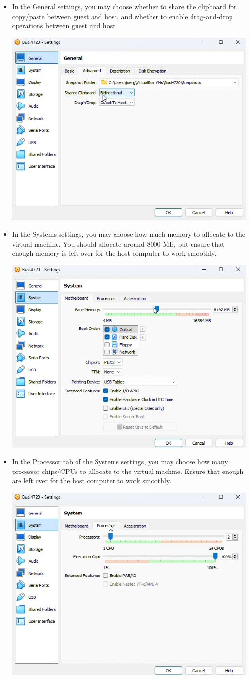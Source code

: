 \begin{enumerate}
\begin{itemize}
\begin{center}
      \end{center}
   \item In the General settings, you may choose whether to share the clipboard for copy/paste between guest and host, and whether to enable drag-and-drop operations between guest and host.
      \begin{center}
      \includegraphics[width=.5\textwidth]{screen19.png}
      \end{center}
   \item In the Systems settings, you may choose how much memory to allocate to the virtual machine. You should allocate around 8000 MB, but ensure that enough memory is left over for the host computer to work smoothly.
      \begin{center}
      \includegraphics[width=.5\textwidth]{screen20.png}
      \end{center}
   \item In the Processor tab of the Systems settings, you may choose how many processor chips/CPUs to allocate to the virtual machine. Ensure that enough are left over for the host computer to work smoothly.
      \begin{center}
      \includegraphics[width=.5\textwidth]{screen21.png}

\end{center}
\end{itemize}
\end{enumerate}
